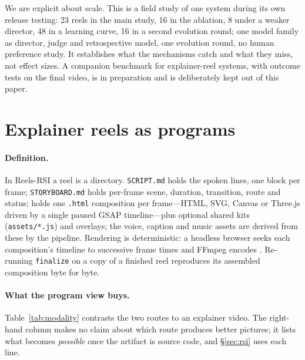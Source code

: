 \documentclass[11pt]{article}
\newcommand{\sys}{Reels-RSI}
\begin{document}
We are explicit about scale. This is a field study of one system during its own release testing:
23 reels in the main study, 16 in the ablation, 8 under a weaker director, 48 in a learning curve, 16 in a second evolution round; one model family as director, judge and retrospective
model, one evolution round, no human preference study. It establishes what the mechanisms catch and
what they miss, not effect sizes. A companion benchmark for explainer-reel systems, with outcome tests
on the final video, is in preparation and is deliberately kept out of this paper.

\section{Explainer reels as programs}
\label{sec:modality}

\paragraph{Definition.} In \sys{} a reel is a directory. \texttt{SCRIPT.md} holds the spoken lines,
one block per frame; \texttt{STORYBOARD.md} holds per-frame scene, duration, transition, route and
status;  holds one \texttt{.html} composition per frame---HTML, SVG,
Canvas or Three.js driven by a single paused GSAP timeline---plus optional shared kits
(\texttt{assets/*.js}) and overlays; the voice, caption and music assets are derived from these by
the pipeline. Rendering is deterministic: a headless browser seeks each composition's timeline to
successive frame times and FFmpeg encodes \citep{hyperframes}. Re-running \texttt{finalize} on a copy
of a finished reel reproduces its assembled composition byte for byte.

\paragraph{What the program view buys.} Table~\ref{tab:modality} contrasts the two routes to an
explainer video. The right-hand column makes no claim about which route produces better pictures;
it lists what becomes \emph{possible} once the artifact is source code, and \S\ref{sec:rsi} uses
each line.
\end{document}

